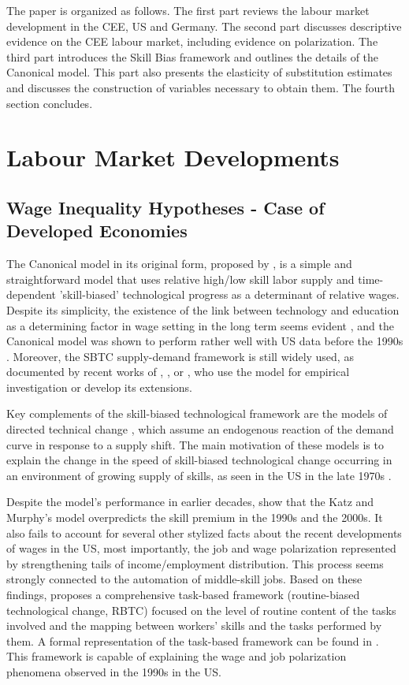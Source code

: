 \documentclass[11pt]{article}
\begin{document}
The paper is organized as follows. The first part reviews the labour market development in the CEE, US and Germany. The second part discusses descriptive evidence on the CEE labour market, including evidence on polarization. The third part introduces the Skill Bias framework and outlines the details of the Canonical model. This part also presents the elasticity of substitution estimates and discusses the construction of variables necessary to obtain them. The fourth section concludes.

\section{Labour Market Developments}
\subsection{Wage Inequality Hypotheses - Case of Developed Economies}

The Canonical model in its original form, proposed by \citet{katz1992changes}, is a simple and straightforward model that uses relative high/low skill labor supply and time-dependent 'skill-biased' technological progress as a determinant of relative wages. Despite its simplicity, the existence of the link between technology and education as a determining factor in wage setting in the long term seems evident \citep{piketty2018capital}, and the Canonical model was shown to perform rather well with US data before the 1990s \citep{katz1992changes}. Moreover, the SBTC supply-demand framework is still widely used, as documented by recent works of \cite{glitz2021skill}, \cite{aziz2021between}, or \cite{farber2021unions}, who use the model for empirical investigation or develop its extensions.

Key complements of the skill-biased technological framework are the models of directed technical change \citep{acemoglu2002directed, acemoglu2002technical}, which assume an endogenous reaction of the demand curve in response to a supply shift. The main motivation of these models is to explain the change in the speed of skill-biased technological change occurring in an environment of growing supply of skills, as seen in the US in the late 1970s \citep{acemoglu2002directed}.

Despite the model's performance in earlier decades, \citet{acemoglu2011skills} show that the Katz and Murphy's model overpredicts the skill premium in the 1990s and the 2000s. It also fails to account for several other stylized facts about the recent developments of wages in the US, most importantly, the job and wage polarization represented by strengthening tails of income/employment distribution. This process seems strongly connected to the automation of middle-skill jobs. Based on these findings, \citet{acemoglu2012does} proposes a comprehensive task-based framework (routine-biased technological change, RBTC) focused on the level of routine content of the tasks involved and the mapping between workers' skills and the tasks performed by them. A formal representation of the task-based framework can be found in \citet{acemoglu2011skills}. This framework is capable of explaining the wage and job polarization phenomena observed in the 1990s in the US.
\end{document}
